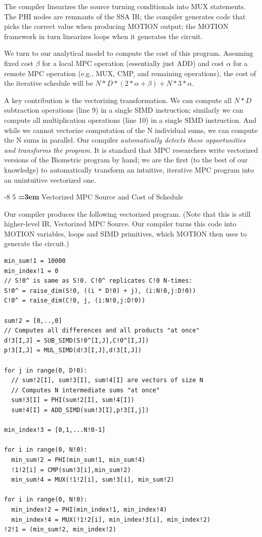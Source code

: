 \documentclass[sigconf, screen, natbib=false, dvipsnames, table]{acmart}
\makeatletter
\renewcommand{\subsection}{\@startsection{subsection}{2}{\z@}%
                        {-8\p@ \@plus -4\p@ \@minus -4\p@}%
                        {5\p@ \@plus 2\p@ \@minus 2\p@}%
                        {\normalfont\Large\bfseries\boldmath
                         \rightskip=\z@ \@plus 3em\pretolerance=10000 }}
\theoremstyle{definition}
\makeatother
\begin{document}
The compiler linearizes the source turning conditionals into MUX statements. The PHI nodes
are remnants of the SSA IR; the compiler generates code that picks the correct value 
when producing MOTION output; the MOTION framework in turn linearizes 
loops when it generates the circuit.

We turn to our analytical model to compute the cost of this program. Assuming fixed 
cost $\beta$ for a local MPC operation (essentially just ADD) and cost $\alpha$ for a remote
MPC operation (e.g., MUX, CMP, and remaining operations), the cost of the iterative schedule 
will be $N*D*(2*\alpha+\beta) + N*3*\alpha$. 

A key contribution is the vectorizing transformation. We can compute all $N*D$ 
subtraction operations (line 9) in a single SIMD instruction; similarly we can compute 
all multiplication operations (line 10) in a single SIMD instruction. And while we cannot
vectorize computation of the N individual sums, we can compute the N sums in parallel. 
Our compiler \emph{automatically detects these opportunities and transforms the program}. 
It is standard that MPC researchers write vectorized versions of the Biometric
program by hand; we are the first (to the best of our knowledge) to automatically 
transform an intuitive, iterative MPC program into an unintuitive vectorized one.

\subsection{Vectorized MPC Source and Cost of Schedule}

Our compiler produces the following vectorized program. (Note that this is
still higher-level IR, Vectorized MPC Source. Our compiler turns this code into MOTION variables, 
loops and SIMD primitives, which MOTION then uses to generate the circuit.)

{\small
\begin{verbatim}
min_sum!1 = 10000
min_index!1 = 0
// S!0^ is same as S!0. C!0^ replicates C!0 N-times: 
S!0^ = raise_dim(S!0, ((i * D!0) + j), (i:N!0,j:D!0))
C!0^ = raise_dim(C!0, j, (i:N!0,j:D!0))

sum!2 = [0,..,0]
// Computes all differences and all products "at once"
d!3[I,J] = SUB_SIMD(S!0^[I,J],C!0^[I,J])
p!3[I,J] = MUL_SIMD(d!3[I,J],d!3[I,J])

for j in range(0, D!0):
  // sum!2[I], sum!3[I], sum!4[I] are vectors of size N  
  // Computes N intermediate sums "at once"
  sum!3[I] = PHI(sum!2[I], sum!4[I])       
  sum!4[I] = ADD_SIMD(sum!3[I],p!3[I,j])

min_index!3 = [0,1,...N!0-1]   

for i in range(0, N!0):
  min_sum!2 = PHI(min_sum!1, min_sum!4) 
  !1!2[i] = CMP(sum!3[i],min_sum!2)
  min_sum!4 = MUX(!1!2[i], sum!3[i], min_sum!2)
    
for i in range(0, N!0):
  min_index!2 = PHI(min_index!1, min_index!4)  
  min_index!4 = MUX(!1!2[i], min_index!3[i], min_index!2)
!2!1 = (min_sum!2, min_index!2)   
\end{verbatim}
}
\end{document}
